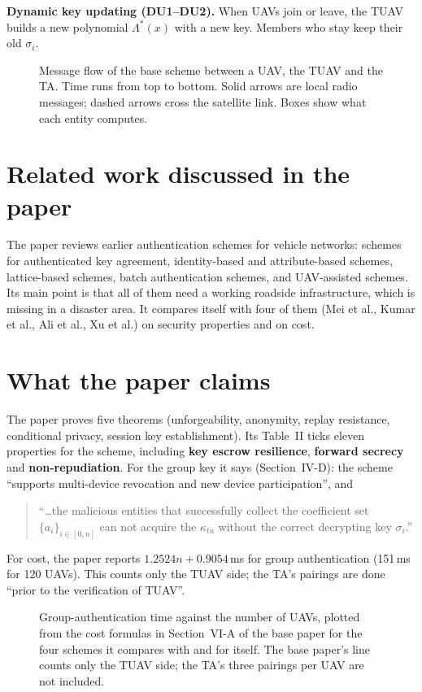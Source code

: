 \documentclass[11pt,openany]{report}
\begin{document}
\textbf{Dynamic key updating (DU1--DU2).} When UAVs join or leave, the TUAV builds a new polynomial $\Lambda^*(x)$ with a new key. Members who stay keep
their old $\sigma_i$.

\begin{figure}[H]
\centering

\caption{Message flow of the base scheme between a UAV, the TUAV and the TA. Time runs from top to bottom. Solid arrows are local radio messages; dashed
arrows cross the satellite link. Boxes show what each entity computes.}
\label{fig:baseflow}
\end{figure}

\section{Related work discussed in the paper}
The paper reviews earlier authentication schemes for vehicle networks: schemes for authenticated key agreement, identity-based and attribute-based
schemes, lattice-based schemes, batch authentication schemes, and UAV-assisted schemes. Its main point is that all of them need a working roadside
infrastructure, which is missing in a disaster area. It compares itself with four of them (Mei et al., Kumar et al., Ali et al., Xu et al.) on
security properties and on cost.

\section{What the paper claims}
The paper proves five theorems (unforgeability, anonymity, replay resistance, conditional privacy, session key establishment). Its Table~II ticks eleven
properties for the scheme, including \textbf{key escrow resilience}, \textbf{forward secrecy} and \textbf{non-repudiation}. For the group key it says
(Section~IV-D): the scheme ``supports multi-device revocation and new device participation'', and
\begin{quote}
``\dots the malicious entities that successfully collect the coefficient set $\{a_i\}_{i\in[0,n]}$ can not acquire the $\kappa_{tu}$ without the correct
decrypting key $\sigma_i$.''
\end{quote}
For cost, the paper reports $1.2524n+0.9054$\,ms for group authentication (151\,ms for 120 UAVs). This counts only the TUAV side; the TA's pairings are
done ``prior to the verification of TUAV''.

\begin{figure}[H]
\centering

\caption{Group-authentication time against the number of UAVs, plotted from the cost formulas in Section~VI-A of the base paper for the four schemes it
compares with and for itself. The base paper's line counts only the TUAV side; the TA's three pairings per UAV are not included.}
\label{fig:p1cost}
\end{figure}
\end{document}
